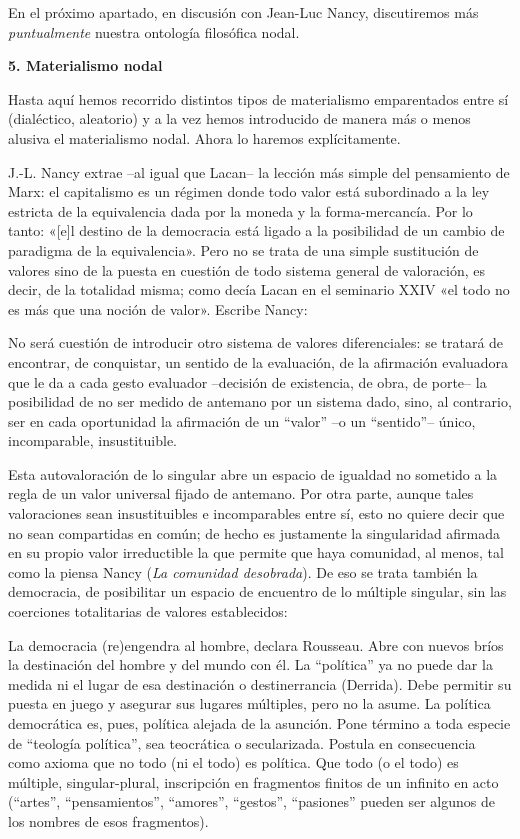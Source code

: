 En el próximo apartado, en discusión con Jean-Luc Nancy, discutiremos más \emph{puntualmente} nuestra ontología filosófica nodal.

\textbf{5. Materialismo nodal }

Hasta aquí hemos recorrido distintos tipos de materialismo emparentados entre sí (dialéctico, aleatorio) y a la vez hemos introducido de manera más o menos alusiva el materialismo nodal. Ahora lo haremos explícitamente.

J.-L. Nancy extrae --al igual que Lacan-- la lección más simple del pensamiento de Marx: el capitalismo es un régimen donde todo valor está subordinado a la ley estricta de la equivalencia dada por la moneda y la forma-mercancía. Por lo tanto: «{[}e{]}l destino de la democracia está ligado a la posibilidad de un cambio de paradigma de la equivalencia». Pero no se trata de una simple sustitución de valores sino de la puesta en cuestión de todo sistema general de valoración, es decir, de la totalidad misma; como decía Lacan en el seminario XXIV «el todo no es más que una noción de valor». Escribe Nancy:

No será cuestión de introducir otro sistema de valores diferenciales: se tratará de encontrar, de conquistar, un sentido de la evaluación, de la afirmación evaluadora que le da a cada gesto evaluador --decisión de existencia, de obra, de porte-- la posibilidad de no ser medido de antemano por un sistema dado, sino, al contrario, ser en cada oportunidad la afirmación de un ``valor'' --o un ``sentido''-- único, incomparable, insustituible.

Esta autovaloración de lo singular abre un espacio de igualdad no sometido a la regla de un valor universal fijado de antemano. Por otra parte, aunque tales valoraciones sean insustituibles e incomparables entre sí, esto no quiere decir que no sean compartidas en común; de hecho es justamente la singularidad afirmada en su propio valor irreductible la que permite que haya comunidad, al menos, tal como la piensa Nancy (\emph{La comunidad desobrada}). De eso se trata también la democracia, de posibilitar un espacio de encuentro de lo múltiple singular, sin las coerciones totalitarias de valores establecidos:

La democracia (re)engendra al hombre, declara Rousseau. Abre con nuevos bríos la destinación del hombre y del mundo con él. La ``política'' ya no puede dar la medida ni el lugar de esa destinación o destinerrancia (Derrida). Debe permitir su puesta en juego y asegurar sus lugares múltiples, pero no la asume. La política democrática es, pues, política alejada de la asunción. Pone término a toda especie de ``teología política'', sea teocrática o secularizada. Postula en consecuencia como axioma que no todo (ni el todo) es política. Que todo (o el todo) es múltiple, singular-plural, inscripción en fragmentos finitos de un infinito en acto (``artes'', ``pensamientos'', ``amores'', ``gestos'', ``pasiones'' pueden ser algunos de los nombres de esos fragmentos).

